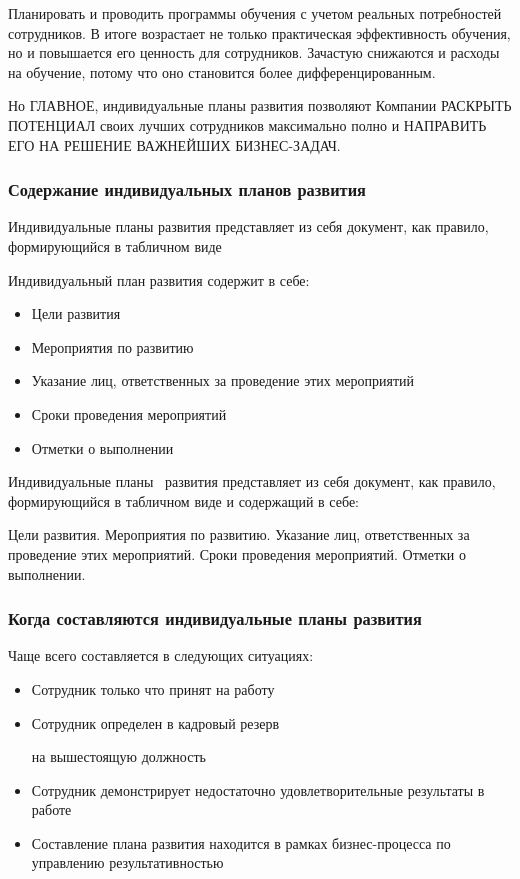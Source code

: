 \documentclass{../industrial-development}
\begin{document}
	Планировать и проводить программы обучения с учетом реальных потребностей сотрудников. В итоге возрастает не только практическая эффективность обучения, но и повышается его ценность для сотрудников. Зачастую снижаются и расходы на обучение, потому что оно становится более дифференцированным.


Но ГЛАВНОЕ, индивидуальные планы развития позволяют Компании РАСКРЫТЬ ПОТЕНЦИАЛ своих лучших сотрудников максимально полно и НАПРАВИТЬ ЕГО НА РЕШЕНИЕ ВАЖНЕЙШИХ БИЗНЕС-ЗАДАЧ.

\begin{frame} \frametitle{Содержание индивидуальных планов развития}
  \begin{block}{ }
Индивидуальные планы развития представляет из себя документ, как правило, формирующийся в табличном виде 
  \end{block}

  \bigskip
Индивидуальный план развития содержит в себе:  
   \begin{itemize}
  \item Цели развития
  \item Мероприятия по развитию
  \item	 Указание лиц, ответственных за проведение этих мероприятий
 \item	Сроки проведения мероприятий
 \item	Отметки о выполнении
  \end{itemize}
\end{frame}

\lecturenotes

Индивидуальные планы~\cite{IPlan} развития представляет из себя документ, как правило, формирующийся в табличном виде и содержащий в себе:

  Цели развития.
 Мероприятия по развитию.
  Указание лиц, ответственных за проведение этих мероприятий.
 Сроки проведения мероприятий.
Отметки о выполнении.

\begin{frame} \frametitle{Когда составляются индивидуальные планы развития }
  \begin{block}{ }
Чаще всего составляется в следующих ситуациях:

  \end{block}
  
   \begin{itemize}
  \item Сотрудник только что принят на работу
  \item Сотрудник определен в кадровый резерв 

на вышестоящую должность
  \item	 Сотрудник демонстрирует недостаточно удовлетворительные результаты в работе
  \item	 Составление плана развития находится в рамках бизнес-процесса по управлению результативностью
  \end{itemize}
\end{frame}
\end{document}
